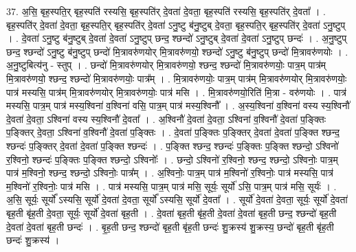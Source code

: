 \documentclass[17pt]{extarticle}
\begin{document}
37. अ॒सि॒ बृह॒स्पति॒र् बृह॒स्पति॑ रस्यसि॒ बृह॒स्पति॑र् दे॒वता॑ दे॒वता॒ बृह॒स्पति॑ रस्यसि॒ बृह॒स्पति॑र् दे॒वता᳚ । . बृह॒स्पति॑र् दे॒वता॑ दे॒वता॒ बृह॒स्पति॒र् बृह॒स्पति॑र् दे॒वता॑ ऽनु॒ष्टु ब॑नु॒ष्टुब् दे॒वता॒ बृह॒स्पति॒र् बृह॒स्पति॑र् दे॒वता॑ ऽनु॒ष्टुप् । . दे॒वता॑ ऽनु॒ष्टु ब॑नु॒ष्टुब् दे॒वता॑ दे॒वता॑ ऽनु॒ष्टुप् छन्द॒ श्छन्दो॑ ऽनु॒ष्टुब् दे॒वता॑ दे॒वता॑ ऽनु॒ष्टुप् छन्दः॑ । . अ॒नु॒ष्टुप् छन्द॒ श्छन्दो॑ ऽनु॒ष्टु ब॑नु॒ष्टुप् छन्दो॑ मि॒त्रावरु॑णयोर् मि॒त्रावरु॑णयो॒ श्छन्दो॑ ऽनु॒ष्टु ब॑नु॒ष्टुप् छन्दो॑ मि॒त्रावरु॑णयोः । . अ॒नु॒ष्टुबित्य॑नु - स्तुप् । . छन्दो॑ मि॒त्रावरु॑णयोर् मि॒त्रावरु॑णयो॒ श्छन्द॒ श्छन्दो॑ मि॒त्रावरु॑णयोः॒ पात्र॒म् पात्र॑म् मि॒त्रावरु॑णयो॒ श्छन्द॒ श्छन्दो॑ मि॒त्रावरु॑णयोः॒ पात्र᳚म् । . मि॒त्रावरु॑णयोः॒ पात्र॒म् पात्र॑म् मि॒त्रावरु॑णयोर् मि॒त्रावरु॑णयोः॒ पात्र॑ मस्यसि॒ पात्र॑म् मि॒त्रावरु॑णयोर् मि॒त्रावरु॑णयोः॒ पात्र॑ मसि । . मि॒त्रावरु॑णयो॒रिति॑ मि॒त्रा - वरु॑णयोः । . पात्र॑ मस्यसि॒ पात्र॒म् पात्र॑ मस्य॒श्विना॑ व॒श्विना॑ वसि॒ पात्र॒म् पात्र॑ मस्य॒श्विनौ᳚ । . अ॒स्य॒श्विना॑ व॒श्विना॑ वस्य स्य॒श्विनौ॑ दे॒वता॑ दे॒वता॒ ऽश्विना॑ वस्य स्य॒श्विनौ॑ दे॒वता᳚ । . अ॒श्विनौ॑ दे॒वता॑ दे॒वता॒ ऽश्विना॑ व॒श्विनौ॑ दे॒वता॑ प॒ङ्क्तिः प॒ङ्क्तिर् दे॒वता॒ ऽश्विना॑ व॒श्विनौ॑ दे॒वता॑ प॒ङ्क्तिः । . दे॒वता॑ प॒ङ्क्तिः प॒ङ्क्तिर् दे॒वता॑ दे॒वता॑ प॒ङ्क्ति श्छन्द॒ श्छन्दः॑ प॒ङ्क्तिर् दे॒वता॑ दे॒वता॑ प॒ङ्क्ति श्छन्दः॑ । . प॒ङ्क्ति श्छन्द॒ श्छन्दः॑ प॒ङ्क्तिः प॒ङ्क्ति श्छन्दो॒ ऽश्विनो॑ र॒श्विनो॒ श्छन्दः॑ प॒ङ्क्तिः प॒ङ्क्ति श्छन्दो॒ ऽश्विनोः᳚ । . छन्दो॒ ऽश्विनो॑ र॒श्विनो॒ श्छन्द॒ श्छन्दो॒ ऽश्विनोः॒ पात्र॒म् पात्र॑ म॒श्विनो॒ श्छन्द॒ श्छन्दो॒ ऽश्विनोः॒ पात्र᳚म् । . अ॒श्विनोः॒ पात्र॒म् पात्र॑ म॒श्विनो॑ र॒श्विनोः॒ पात्र॑ मस्यसि॒ पात्र॑ म॒श्विनो॑ र॒श्विनोः॒ पात्र॑ मसि । . पात्र॑ मस्यसि॒ पात्र॒म् पात्र॑ मसि॒ सूर्यः॒ सूर्यो॑ ऽसि॒ पात्र॒म् पात्र॑ मसि॒ सूर्यः॑ । . अ॒सि॒ सूर्यः॒ सूर्यो᳚ ऽस्यसि॒ सूर्यो॑ दे॒वता॑ दे॒वता॒ सूर्यो᳚ ऽस्यसि॒ सूर्यो॑ दे॒वता᳚ । . सूर्यो॑ दे॒वता॑ दे॒वता॒ सूर्यः॒ सूर्यो॑ दे॒वता॑ बृह॒ती बृ॑ह॒ती दे॒वता॒ सूर्यः॒ सूर्यो॑ दे॒वता॑ बृह॒ती । . दे॒वता॑ बृह॒ती बृ॑ह॒ती दे॒वता॑ दे॒वता॑ बृह॒ती छन्द॒ श्छन्दो॑ बृह॒ती दे॒वता॑ दे॒वता॑ बृह॒ती छन्दः॑ । . बृ॒ह॒ती छन्द॒ श्छन्दो॑ बृह॒ती बृ॑ह॒ती छन्दः॑ शु॒क्रस्य॑ शु॒क्रस्य॒ छन्दो॑ बृह॒ती बृ॑ह॒ती छन्दः॑ शु॒क्रस्य॑ । \newline
\pagebreak
{}
\end{document}

